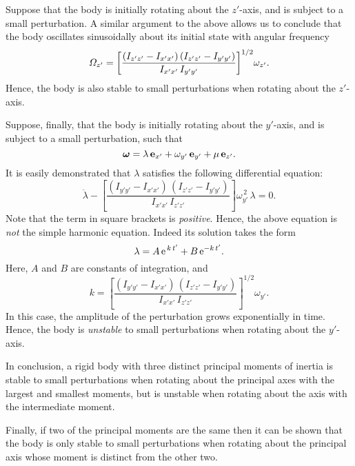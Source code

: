Suppose that the body is initially rotating about the $z'$-axis, and
is subject to a small perturbation. A similar argument to the above allows
us to conclude that the body oscillates sinusoidally about its initial state
with angular frequency
\begin{equation}
{\mit\Omega}_{z'} = \left[\frac{(I_{z'z'}-I_{x'x'})\,(I_{z'z'}-I_{y'y'})}{I_{x'x'}\,I_{y'y'}}\right]^{1/2}\! \omega_{z'}.
\end{equation}
Hence, the body is also stable to small perturbations when rotating about the
$z'$-axis.

Suppose, finally, that the body is initially rotating about the $y'$-axis,
and is subject to a small perturbation, such that
\begin{equation}
\mbox{\boldmath$\omega$} = \lambda\,{\bf e}_{x'} + \omega_{y'}\,{\bf e}_{y'} + \mu\,{\bf e}_{z'}.
\end{equation}
It is easily demonstrated that $\lambda$ satisfies the following differential
equation:
\begin{equation}
\ddot{\lambda} - \left[\frac{(I_{y'y'}-I_{x'x'})\,(I_{z'z'}-I_{y'y'})}{I_{x'x'}\,I_{z'z'}}\right]\omega_{y'}^{\,2} \,\lambda = 0.
\end{equation}
Note that the term in square brackets is {\em positive}. Hence, the
above equation is {\em not}\/ the simple harmonic equation. Indeed
its solution takes the form
\begin{equation}
\lambda = A\,{\rm e}^{\,k\,t'} + B\,{\rm e}^{-k\,t'}.
\end{equation}
Here, $A$ and $B$ are constants of integration, and
\begin{equation}
k= \left[\frac{(I_{y'y'}-I_{x'x'})\,(I_{z'z'}-I_{y'y'})}{I_{x'x'}\,I_{z'z'}}\right]^{1/2}\omega_{y'}.
\end{equation}
In this case, the amplitude of the perturbation grows exponentially in time.
Hence,  the body is {\em unstable}\/ to small perturbations
when rotating about the $y'$-axis.

In conclusion,  a rigid body with three distinct principal moments of inertia is stable to small perturbations when rotating about the
principal axes with the largest and smallest  moments, but
is unstable when rotating about the axis with the intermediate
 moment.

Finally, if two of the principal moments are the same then it can be shown
that the body is only stable to small perturbations when rotating
about the principal axis whose  moment is distinct from the other two.

